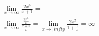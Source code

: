 \begin{ex}
\begin{align}
&\lim_{x\rightarrow \infty} \frac{2x^3}{x+1}=\nonumber\\
&\lim_{x\rightarrow \infty} \frac{\frac{2x^3}{x}}{\frac{x+1}{x}}=\lim_{x\rightarrow |infty} \frac{2x^2}{1+\frac{1}{x}}=\infty\nonumber
\end{align}
\end{ex}